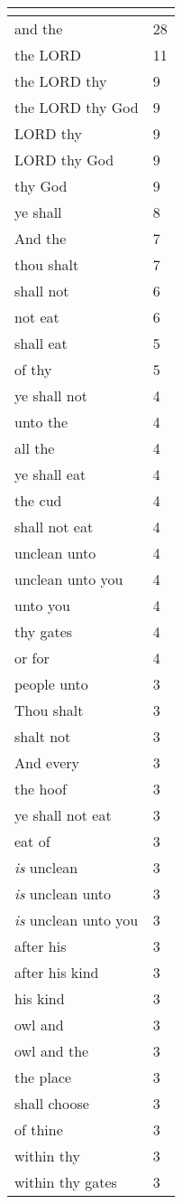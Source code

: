 \begin{center}
\begin{longtable}{|p{3.0in}|p{0.5in}|}
\hline \multicolumn{2}{c}{{ }} \\ \hline
\endfoot 
and the & 28\\ \hline 
the LORD & 11\\ \hline 
the LORD thy & 9\\ \hline 
the LORD thy God & 9\\ \hline 
LORD thy & 9\\ \hline 
LORD thy God & 9\\ \hline 
thy God & 9\\ \hline 
ye shall & 8\\ \hline 
And the & 7\\ \hline 
thou shalt & 7\\ \hline 
shall not & 6\\ \hline 
not eat & 6\\ \hline 
shall eat & 5\\ \hline 
of thy & 5\\ \hline 
ye shall not & 4\\ \hline 
unto the & 4\\ \hline 
all the & 4\\ \hline 
ye shall eat & 4\\ \hline 
the cud & 4\\ \hline 
shall not eat & 4\\ \hline 
unclean unto & 4\\ \hline 
unclean unto you & 4\\ \hline 
unto you & 4\\ \hline 
thy gates & 4\\ \hline 
or for & 4\\ \hline 
people unto & 3\\ \hline 
Thou shalt & 3\\ \hline 
shalt not & 3\\ \hline 
And every & 3\\ \hline 
the hoof & 3\\ \hline 
ye shall not eat & 3\\ \hline 
eat of & 3\\ \hline 
\emph{is} unclean & 3\\ \hline 
\emph{is} unclean unto & 3\\ \hline 
\emph{is} unclean unto you & 3\\ \hline 
after his & 3\\ \hline 
after his kind & 3\\ \hline 
his kind & 3\\ \hline 
owl and & 3\\ \hline 
owl and the & 3\\ \hline 
the place & 3\\ \hline 
shall choose & 3\\ \hline 
of thine & 3\\ \hline 
within thy & 3\\ \hline 
within thy gates & 3\\ \hline 
\end{longtable}
\end{center}





